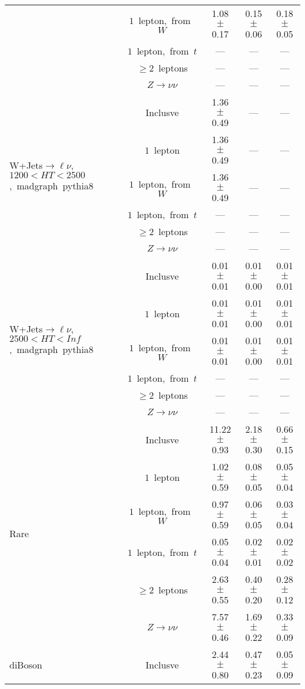 \documentclass{article}
\begin{document}
\begin{longtable}{|l|c|c|c|c|}
 & $1$~lepton,~from~$W$  & 1.08 $\pm$ 0.17  & 0.15 $\pm$ 0.06  & 0.18 $\pm$ 0.05 \\* 
 & $1$~lepton,~from~$t$  & ---  & ---  & --- \\* 
 & $\ge2$~leptons  & ---  & ---  & --- \\* 
 & $Z\rightarrow\nu\nu$  & ---  & ---  & --- \\* 
\hline 
\multirow{6}{*}{W+Jets$\rightarrow\ell\nu$,~$1200<HT<2500$,~madgraph~pythia8} & Inclusve  & 1.36 $\pm$ 0.49  & ---  & --- \\* 
 & $1$~lepton  & 1.36 $\pm$ 0.49  & ---  & --- \\* 
 & $1$~lepton,~from~$W$  & 1.36 $\pm$ 0.49  & ---  & --- \\* 
 & $1$~lepton,~from~$t$  & ---  & ---  & --- \\* 
 & $\ge2$~leptons  & ---  & ---  & --- \\* 
 & $Z\rightarrow\nu\nu$  & ---  & ---  & --- \\* 
\hline 
\multirow{6}{*}{W+Jets$\rightarrow\ell\nu$,~$2500<HT<Inf$,~madgraph~pythia8} & Inclusve  & 0.01 $\pm$ 0.01  & 0.01 $\pm$ 0.00  & 0.01 $\pm$ 0.01 \\* 
 & $1$~lepton  & 0.01 $\pm$ 0.01  & 0.01 $\pm$ 0.00  & 0.01 $\pm$ 0.01 \\* 
 & $1$~lepton,~from~$W$  & 0.01 $\pm$ 0.01  & 0.01 $\pm$ 0.00  & 0.01 $\pm$ 0.01 \\* 
 & $1$~lepton,~from~$t$  & ---  & ---  & --- \\* 
 & $\ge2$~leptons  & ---  & ---  & --- \\* 
 & $Z\rightarrow\nu\nu$  & ---  & ---  & --- \\* 
\hline 
\multirow{6}{*}{Rare} & Inclusve  & 11.22 $\pm$ 0.93  & 2.18 $\pm$ 0.30  & 0.66 $\pm$ 0.15 \\* 
 & $1$~lepton  & 1.02 $\pm$ 0.59  & 0.08 $\pm$ 0.05  & 0.05 $\pm$ 0.04 \\* 
 & $1$~lepton,~from~$W$  & 0.97 $\pm$ 0.59  & 0.06 $\pm$ 0.05  & 0.03 $\pm$ 0.04 \\* 
 & $1$~lepton,~from~$t$  & 0.05 $\pm$ 0.04  & 0.02 $\pm$ 0.01  & 0.02 $\pm$ 0.02 \\* 
 & $\ge2$~leptons  & 2.63 $\pm$ 0.55  & 0.40 $\pm$ 0.20  & 0.28 $\pm$ 0.12 \\* 
 & $Z\rightarrow\nu\nu$  & 7.57 $\pm$ 0.46  & 1.69 $\pm$ 0.22  & 0.33 $\pm$ 0.09 \\* 
\hline 
\multirow{6}{*}{diBoson} & Inclusve  & 2.44 $\pm$ 0.80  & 0.47 $\pm$ 0.23  & 0.05 $\pm$ 0.09 \\* 

\end{longtable}
\end{document}
